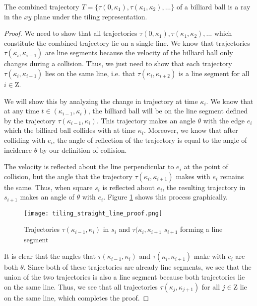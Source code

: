 \begin{theorem}
  The combined trajectory $T = \{\tau(0, \kappa_1), \tau(\kappa_1, \kappa_2), \ldots\}$ of a billiard ball is a ray in the $xy$ plane under the tiling representation.
  \label{theorem:straight-line}
\end{theorem}
\begin{proof}
  We need to show that all trajectories $\tau(0, \kappa_1), \tau(\kappa_1, \kappa_2), \ldots$ which constitute the combined trajectory lie on a single line. We know that trajectories $\tau(\kappa_i, \kappa_{i+1})$ are line segments because the velocity of the billiard ball only changes during a collision. Thus, we just need to show that each trajectory $\tau(\kappa_i, \kappa_{i+1})$ lies on the same line, i.e. that $\tau(\kappa_i, \kappa_{i+2})$ is a line segment for all $i \in \mathrm{Z}$.

  We will show this by analyzing the change in trajectory at time $\kappa_i$. We know that at any time $t \in (\kappa_{i-1}, \kappa_i)$, the billiard ball will be on the line segment defined by the trajectory $\tau(\kappa_{i-1}, \kappa_i)$. This trajectory makes an angle $\theta$ with the edge $e_i$ which the billiard ball collides with at time $\kappa_i$. Moreover, we know that after colliding with $e_i$, the angle of reflection of the trajectory is equal to the angle of incidence $\theta$ by our definition of collision.

The velocity is reflected about the line perpendicular to $e_i$ at the point of collision, but the angle that the trajectory $\tau(\kappa_i, \kappa_{i+1})$ makes with $e_i$ remains the same. Thus, when square $s_{i}$ is reflected about $e_i$, the resulting trajectory in $s_{i+1}$ makes an angle of $\theta$ with $e_i$. Figure \ref{fig:straight-line-angle} shows this process graphically.

\begin{figure}
  \texttt{[image: tiling\_straight\_line\_proof.png]}
  \caption{\label{fig:straight-line-angle}Trajectories $\tau(\kappa_{i-1}, \kappa_i)$ in $s_i$ and $\tau(\kappa_{i}, \kappa_{i+1}$ $s_{i+1}$ forming a line segment}
\end{figure}

It is clear that the angles that $\tau(\kappa_{i-1}, \kappa_i)$ and $\tau(\kappa_{i}, \kappa_{i+1})$ make with $e_i$ are both $\theta$. Since both of these trajectories are already line segments, we see that the union of the two trajectories is also a line segment because both trajectories lie on the same line. Thus, we see that all trajectories $\tau(\kappa_j, \kappa_{j+1})$ for all $j \in \mathrm{Z}$ lie on the same line, which completes the proof.
\end{proof}

